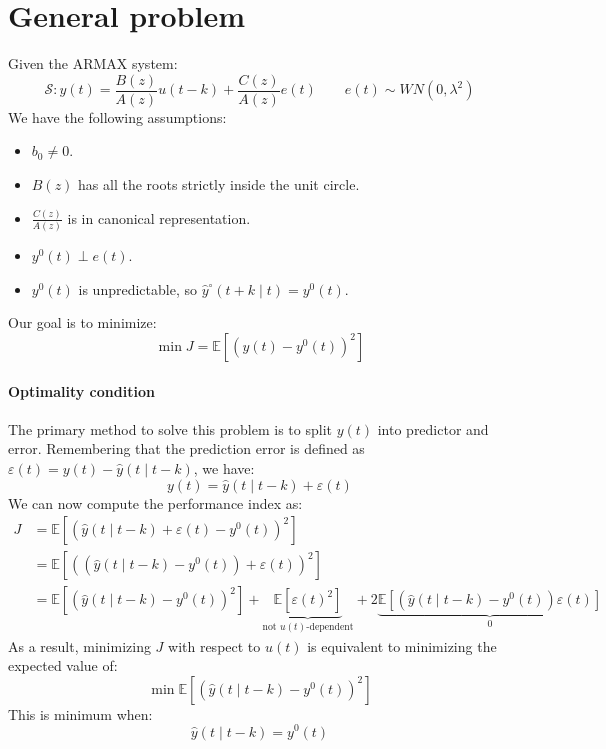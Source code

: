 \section{General problem}

Given the ARMAX system:
\[\mathcal{S}:y(t)=\dfrac{B(z)}{A(z)}u(t-k)+\dfrac{C(z)}{A(z)}e(t) \qquad e(t)\sim WN(0,\lambda^2)\]
We have the following assumptions:
\begin{itemize}
    \item $b_0\neq 0$. 
    \item $B(z)$ has all the roots strictly inside the unit circle.
    \item $\frac{C(z)}{A(z)}$ is in canonical representation. 
    \item $y^{0}(t)\perp e(t)$. 
    \item $y^{0}(t)$ is unpredictable, so $\hat{y}^\circ(t+k\mid t)=y^{0}(t)$. 
\end{itemize}
Our goal is to minimize:
\[\min{J}=\mathbb{E}\left[\left(y(t)-y^{0}(t)\right)^2\right]\]

\paragraph*{Optimality condition}
The primary method to solve this problem is to split $y(t)$  into predictor and error. 
Remembering that the prediction error is defined as $\varepsilon(t)=y(t)-\hat{y}(t\mid t-k)$, we have:
\[y(t)=\hat{y}(t\mid t-k)+\varepsilon(t)\]
We can now compute the performance index as:
\begin{align*}
    J   &=\mathbb{E}\left[\left(\hat{y}(t\mid t-k)+\varepsilon(t)-y^{0}(t)\right)^2\right] \\
        &=\mathbb{E}\left[\left(\left(\hat{y}(t\mid t-k)-y^{0}(t)\right)+\varepsilon(t)\right)^2\right] \\
        &=\mathbb{E}\left[\left(\hat{y}(t\mid t-k)-y^{0}(t)\right)^2\right]+\underbrace{\mathbb{E}\left[\varepsilon(t)^2\right]}_{\text{not }u(t)\text{-dependent}} +2\underbrace{\mathbb{E}\left[\left(\hat{y}(t\mid t-k)-y^{0}(t)\right)\varepsilon(t)\right]}_0 
\end{align*}
As a result, minimizing $J$ with respect to $u(t)$  is equivalent to minimizing the expected value of:
\[\min\mathbb{E}\left[\left(\hat{y}(t\mid t-k)-y^{0}(t)\right)^2\right]\]
This is minimum when:
\[\hat{y}(t\mid t-k)=y^{0}(t)\]


